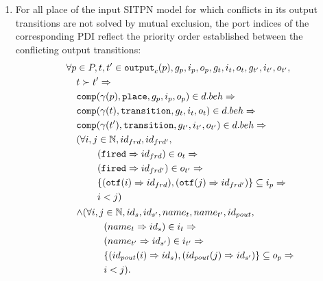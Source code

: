 \begin{definition}
  \begin{enumerate}[resume]
  \item\label{it:port-indices-ordering} For all place of the input
    SITPN model for which conflicts in its output transitions are not
    solved by mutual exclusion, the port indices of the corresponding
    PDI reflect the priority order established between the conflicting
    output transitions:
    \begin{equation*}
      \begin{aligned}[t]
        \forall{}p&\in{}P,t,t'\in{}\mathtt{output}_c(p),g_p,i_p,o_p,g_t,i_t,o_t,g_{t'},i_{t'},o_{t'}, \\
                  & t\succ{}t'\Rightarrow\\
                  & \mathtt{comp}(\gamma(p),\mathtt{place},g_p,i_p,o_p)\in{}d.beh\Rightarrow \\
                  & \mathtt{comp}(\gamma(t),\mathtt{transition},g_{t},i_{t},o_{t})\in{}d.beh\Rightarrow \\
                  & \mathtt{comp}(\gamma(t'),\mathtt{transition},g_{t'},i_{t'},o_{t'})\in{}d.beh\Rightarrow \\
                  &
                    \begin{aligned}[t]
                      (\forall{}i,j&\in\mathbb{N},id_{frd},id_{frd'}, \\
                                   & (\mathtt{fired}\Rightarrow{}id_{frd})\in{}o_t\Rightarrow \\
                                   & (\mathtt{fired}\Rightarrow{}id_{frd'})\in{}o_{t'}\Rightarrow \\
                                   & \{(\mathtt{otf}(i)\Rightarrow{}id_{frd}),(\mathtt{otf}(j)\Rightarrow{}id_{frd'})\}\subseteq{}i_p\Rightarrow \\
                                   & i<j) \\
                    \end{aligned} \\
                  & \begin{aligned}[t]
                      \land(\forall{}i,j&\in\mathbb{N},id_{s},id_{s'},name_t,name_{t'},id_{pout}, \\
                                        & (name_t\Rightarrow{}id_{s})\in{}i_t\Rightarrow \\
                                        & (name_{t'}\Rightarrow{}id_{s'})\in{}i_{t'}\Rightarrow \\
                                        & \{(id_{pout}(i)\Rightarrow{}id_s),(id_{pout}(j)\Rightarrow{}id_{s'})\}\subseteq{}o_p\Rightarrow \\
                                        & i<j). \\
                    \end{aligned} \\
      \end{aligned}
    \end{equation*}
  \end{enumerate}


\end{definition}
